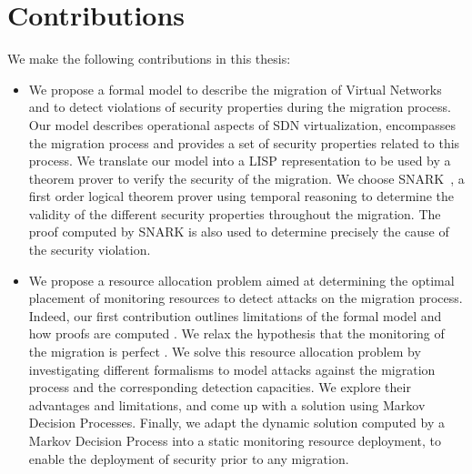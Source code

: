 \section{Contributions}
We make the following contributions in this thesis:

\begin{itemize}
    \item We propose a formal model to describe the migration of Virtual Networks and to detect violations of security properties during the migration process.
    Our model describes operational aspects of SDN virtualization, encompasses the migration process and provides a set of security properties related to this process. We translate our model into a LISP representation to be used by a theorem prover to verify the security of the migration. We choose SNARK~\cite{snark-Stickel2000}, a first order logical theorem prover using temporal reasoning to determine the validity of the different security properties throughout the migration. The proof computed by SNARK is also used to determine precisely the cause of the security violation.
    
    \item  We propose a resource allocation problem aimed at determining the optimal placement of monitoring resources to detect attacks on the migration process. Indeed, our first contribution outlines limitations of the formal model and how proofs are computed
    . We relax the hypothesis that the monitoring of the migration is perfect
    . We solve this resource allocation problem by investigating different formalisms to model attacks against the migration process and the corresponding detection capacities. We explore their advantages and limitations, and come up with a solution using Markov Decision Processes. Finally, we adapt the dynamic solution computed by a Markov Decision Process into a static monitoring resource deployment, to enable the deployment of security prior to any migration.
\end{itemize}


